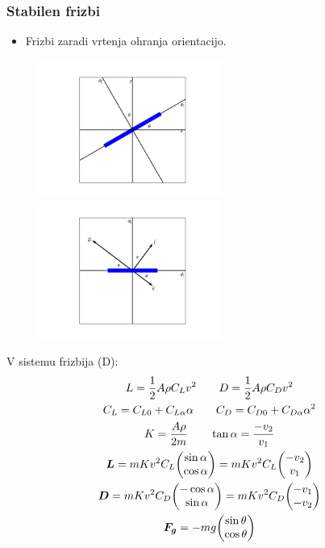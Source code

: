 \documentclass{beamer}
\begin{document}
\begin{frame}
\frametitle{Stabilen frizbi}
\begin{itemize}
\item Frizbi zaradi vrtenja ohranja orientacijo.
\end{itemize}

\begin{figure}[H]
	\centering
	\begin{minipage}{.5\textwidth}
	  \centering
	  \includegraphics[width=6cm]{graf_osi.png}
	\end{minipage}%
	\begin{minipage}{.5\textwidth}
	  \centering
	  \includegraphics[width=6cm]{osi_frisbeeja.png}
	\end{minipage}
\end{figure}

\end{frame}


\begin{frame}
V sistemu frizbija (D):
\begin{gather}
L = \dfrac{1}{2} A \rho C_L v^2 \qquad D = \dfrac{1}{2} A \rho C_D v^2\\
C_L = C_{L0} + C_{L \alpha} \alpha \qquad C_D = C_{D0} + C_{D \alpha} \alpha^2\\
K = \dfrac{A \rho}{2 m} \qquad \tan \alpha = \dfrac{-v_2}{v_1}\\
\bm L = m K v^2 C_L \mqty(\sin \alpha \\ \cos \alpha) = m K v^2 C_L \mqty(-v_2 \\ v_1\\)\\
\bm D = m K v^2 C_D \mqty(-\cos \alpha \\ \sin \alpha) = m K v^2 C_D \mqty(-v_1 \\ -v_2\\)\\
\bm F_{\bm g} = - m g  \mqty(\sin \theta \\ \cos \theta)
\end{gather}
\end{frame}
\end{document}
